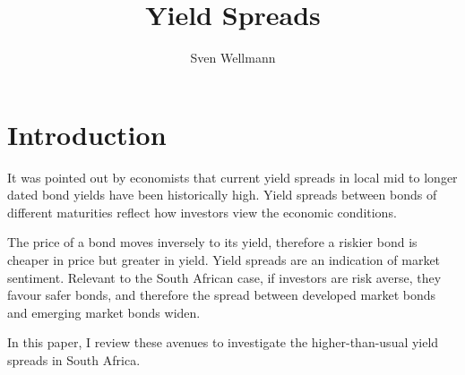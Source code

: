 \documentclass[11pt,preprint, authoryear]{elsarticle}
\numberwithin{equation}{section}
\numberwithin{figure}{section}
\numberwithin{table}{section}
\begin{document}
\begin{frontmatter}  %

\title{Yield Spreads}





\author[Add1]{Sven Wellmann}





\address[Add1]{Stellenbosch University, Stellenbosch, South Africa}



\vspace{1cm}





\vspace{0.5cm}

\end{frontmatter}



\pagestyle{fancy}
\chead{}
\rhead{}
\lfoot{}
\lhead{}
\cfoot{}


\headsep 35pt %




\hypertarget{introduction}{%
\section{\texorpdfstring{Introduction
\label{Introduction}}{Introduction }}\label{introduction}}

It was pointed out by economists that current yield spreads in local mid
to longer dated bond yields have been historically high. Yield spreads
between bonds of different maturities reflect how investors view the
economic conditions.

The price of a bond moves inversely to its yield, therefore a riskier
bond is cheaper in price but greater in yield. Yield spreads are an
indication of market sentiment. Relevant to the South African case, if
investors are risk averse, they favour safer bonds, and therefore the
spread between developed market bonds and emerging market bonds widen.

In this paper, I review these avenues to investigate the
higher-than-usual yield spreads in South Africa.
\end{document}
